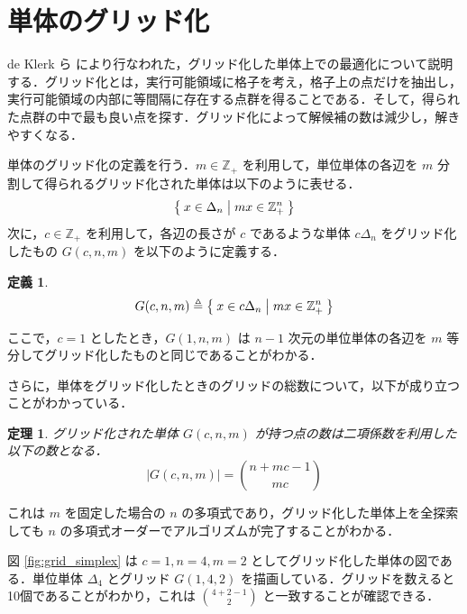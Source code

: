 \documentclass[a4paper,11pt]{jreport}
\newtheorem{definition}{定義}
\newtheorem{theorem}{定理}
\begin{document}
\section{単体のグリッド化} \label{sec:gridize_simplex}
de Klerk ら \cite{deklerk} により行なわれた，グリッド化した単体上での最適化について説明する．グリッド化とは，実行可能領域に格子を考え，格子上の点だけを抽出し，実行可能領域の内部に等間隔に存在する点群を得ることである．そして，得られた点群の中で最も良い点を探す．グリッド化によって解候補の数は減少し，解きやすくなる．\par
単体のグリッド化の定義を行う．$ m \in \mathbb{Z}_+ $ を利用して，単位単体の各辺を $ m $ 分割して得られるグリッド化された単体は以下のように表せる．
$$ \Set{ x \in \Delta_n | mx \in \mathbb{Z}_+^n } $$
次に，$ c \in \mathbb{Z}_+ $ を利用して，各辺の長さが $ c $ であるような単体 $ c \Delta_n $ をグリッド化したもの $ G(c, n, m) $ を以下のように定義する．

\begin{definition}
$$ G(c, n, m) \triangleq \Set{x \in c \Delta_n | mx \in \mathbb{Z}_+^n} $$
\end{definition}

ここで，$ c = 1 $ としたとき，$ G(1, n, m) $ は $ n - 1 $ 次元の単位単体の各辺を $ m $ 等分してグリッド化したものと同じであることがわかる．\par
さらに，単体をグリッド化したときのグリッドの総数について，以下が成り立つことがわかっている．

\begin{theorem} \label{thm:n_grid}
グリッド化された単体 $ G(c, n, m) $ が持つ点の数は二項係数を利用した以下の数となる．
$$ | G(c, n, m) | = \binom{n + mc - 1}{mc} $$
\end{theorem}

これは $ m $ を固定した場合の $ n $ の多項式であり，グリッド化した単体上を全探索しても $ n $ の多項式オーダーでアルゴリズムが完了することがわかる．\par
図 \ref{fig:grid_simplex} は $ c=1, n=4, m=2 $ としてグリッド化した単体の図である．単位単体 $ \Delta_4 $ とグリッド $ G(1, 4, 2) $ を描画している．グリッドを数えると10個であることがわかり，これは $ \binom{4 + 2 - 1}{2} $ と一致することが確認できる．\par
\end{document}
